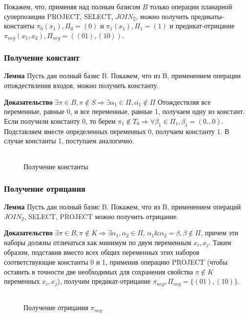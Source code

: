 \documentclass[12pt]{article}
\begin{document}
Покажем, что, применяя над полным базисом $B$ только операции планарной суперпозиции PROJECT, SELECT, $JOIN_2$,
можно получить предикаты-константы
$\pi_0(x_1), \Pi_0=(0)$ и $\pi_1(x_1), \Pi_1=(1)$ и предикат-отрицание $\pi_{neg}(x_1, x_2), \Pi_{neg}=( (01), (10) )$.

\subsubsection{Получение констант}
\textbf{Лемма} Пусть дан полный базис B. Покажем, что из B, применением операции отождествления входов,
можно получить константу.

\textbf{Доказательство} $\exists \pi \in B, \pi \notin S \Rightarrow \exists \alpha_1 \in \Pi, \bar{\alpha_1} \notin \Pi$
Отождествляя все переменные, равные 0, и все переменные, равные 1, получаем одну из констант.
Если получили константу 0, то берем $\pi_1 \notin T_0 \Rightarrow \forall \beta_1 \in \Pi_1, \beta_1=(0 \ldots 0)$. 
Подставляем вместе определенных переменных 0, получаем константу 1. 
В случае константы 1, поступаем аналогично.
\begin{figure}[htb]
\centering
\includegraphics[width=0.01\textwidth]{3_2to3.png}
\caption{Получение константы}
\label{fig:constant}
\end{figure}

\subsubsection{Получение отрицания}
\textbf{Лемма}
Пусть дан полный базис B. Покажем, что из B, применением операций $JOIN_2$, SELECT, PROJECT можно получить отрицание.

\textbf{Доказательство} $\exists \pi \in B, \pi \notin K \Rightarrow \exists \alpha_1, \alpha_2 \in \Pi$,
$\alpha_1\&\alpha_2=\beta, \beta \notin \Pi$, причем эти наборы должны отличаться как минимум по двум переменным $x_i, x_{j}$.
Таким образом, подставив вместо всех общих переменных этих наборов соответствующие константы 0 и 1, применив операцию PROJECT
(чтобы оставить в точности две необходимых для сохранения свойства $\pi \notin K$ переменных $x_i, x_j$), 
получим предикат-отрицание $\pi_{neg}, \Pi_{neg} = \{ (01), (10) \} $.
\begin{figure}[htb]
\centering
\includegraphics[width=0.01\textwidth]{3_2to3.png}
\caption{Получение отрицания $\pi_{neg}$}
\label{fig:negation}
\end{figure}
\end{document}
